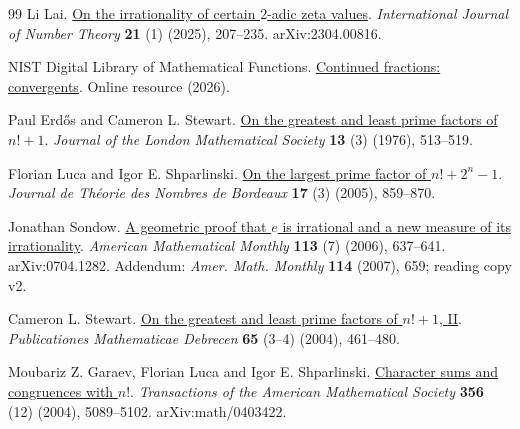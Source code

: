 \documentclass[11pt]{article}
\begin{document}
\begin{thebibliography}{99}
Li Lai. \href{https://doi.org/10.1142/S1793042125500113}{On the irrationality of certain {$2$}-adic zeta values}.
\emph{International Journal of Number Theory} \textbf{21} (1) (2025), 207--235. arXiv:2304.00816.

{NIST Digital Library of Mathematical Functions}. \href{https://dlmf.nist.gov/1.12}{Continued fractions: convergents}.
Online resource (2026).

Paul Erd{\H o}s and Cameron L. Stewart. \href{https://doi.org/10.1112/jlms/s2-13.3.513}{On the greatest and least prime factors of {$n!+1$}}.
\emph{Journal of the London Mathematical Society} \textbf{13} (3) (1976), 513--519.

Florian Luca and Igor E. Shparlinski. \href{https://doi.org/10.5802/jtnb.524}{On the largest prime factor of {$n!+2^n-1$}}.
\emph{Journal de Th{\'e}orie des Nombres de Bordeaux} \textbf{17} (3) (2005), 859--870.

Jonathan Sondow. \href{https://arxiv.org/abs/0704.1282v2}{A geometric proof that {$e$} is irrational and a new measure of its irrationality}.
\emph{American Mathematical Monthly} \textbf{113} (7) (2006), 637--641. arXiv:0704.1282. Addendum: \emph{Amer. Math. Monthly} \textbf{114} (2007), 659; reading copy v2.

Cameron L. Stewart. \href{https://doi.org/10.5486/PMD.2004.3190}{On the greatest and least prime factors of {$n!+1$}, {II}}.
\emph{Publicationes Mathematicae Debrecen} \textbf{65} (3--4) (2004), 461--480.

Moubariz Z. Garaev, Florian Luca and Igor E. Shparlinski. \href{https://doi.org/10.1090/S0002-9947-04-03612-8}{Character sums and congruences with {$n!$}}.
\emph{Transactions of the American Mathematical Society} \textbf{356} (12) (2004), 5089--5102. arXiv:math/0403422.

\end{thebibliography}

\companionpapercontext
\end{document}
